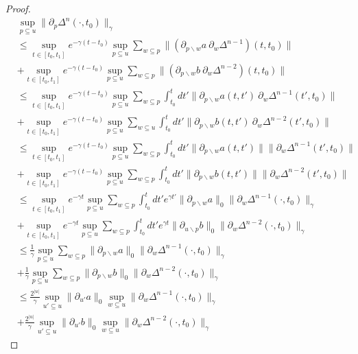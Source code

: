 \documentclass[b5paper,draft,openbib,12pt]{memoir}
\begin{document}
\begin{proof}
\begin{align}
  &\sup_{p\subseteq u}\|\partial_p \Delta^n (\cdot,t_0)\|_{\gamma}\\
  &\le 
  \sup_{t\in[t_0,t_1]} e^{-\gamma(t-t_0)}\sup_{p\subseteq u} 
  \sum_{w\subseteq p} 
  \| (\partial_{p\backslash w}a ~
  \partial_w \Delta^{n-1})(t,t_0)\|\\
  &+\sup_{t\in[t_0,t_1]} e^{-\gamma(t-t_0)}\sup_{p\subseteq u} 
  \sum_{w\subseteq p} 
  \|  (\partial_{p\backslash w}b ~
  \partial_w \Delta^{n-2})(t,t_0) \|\\
  &\le
  \sup_{t\in[t_0,t_1]} e^{-\gamma(t-t_0)}
  \sup_{p\subseteq u} \sum_{w\subseteq p} 
  \int_{t_0}^{t}dt' 
  \| \partial_{p\backslash w}a(t,t') ~
  \partial_w \Delta^{n-1}(t',t_0)\|\\
  &+ \sup_{t\in[t_0,t_1]} e^{-\gamma(t-t_0)}
  \sup_{p\subseteq u}\sum_{w\subseteq u} 
  \int_{t_0}^{t}dt'  
  \|  \partial_{p\backslash w}b(t,t') ~
  \partial_w \Delta^{n-2}(t',t_0) \|\\
  &\le
  \sup_{t\in[t_0,t_1]} e^{-\gamma(t-t_0)}
  \sup_{p\subseteq u} \sum_{w\subseteq p} 
  \int_{t_0}^{t}dt' 
  \| \partial_{p\backslash w}a(t,t')\|
  \|\partial_w \Delta^{n-1}(t',t_0)\|\\
  &+ \sup_{t\in[t_0,t_1]} e^{-\gamma(t-t_0)}
  \sup_{p\subseteq u} \sum_{w\subseteq p} 
  \int_{t_0}^{t}dt'  
  \|  \partial_{p\backslash w}b(t,t')\|
  \|\partial_w \Delta^{n-2}(t',t_0) \|\\
  &\le
  \sup_{t\in[t_0,t_1]} e^{-\gamma t}
  \sup_{p\subseteq u} \sum_{w\subseteq p} 
  \int_{t_0}^{t}dt' e^{\gamma t'}
  \| \partial_{p\backslash w}a \|_{0}
  \|\partial_w \Delta^{n-1}(\cdot,t_0)\|_{\gamma}\\
  &+ \sup_{t\in[t_0,t_1]} e^{-\gamma t}
  \sup_{p\subseteq u}\sum_{w\subseteq p} 
  \int_{t_0}^{t}dt'  e^{\gamma t}
  \|  \partial_{u\backslash p}b\|_{0}
\|\partial_w \Delta^{n-2}(\cdot,t_0) \|_{\gamma}\\
&\le
\frac{1}{\gamma}\sup_{p\subseteq u} \sum_{w\subseteq p} 
\| \partial_{p\backslash w}a \|_{0}
\|\partial_w \Delta^{n-1}(\cdot,t_0)\|_{\gamma}\\
&+ \frac{1}{\gamma}
\sup_{p\subseteq u} \sum_{w\subseteq p} 
\|  \partial_{p\backslash w}b\|_{0}
\|\partial_w \Delta^{n-2}(\cdot,t_0) \|_{\gamma}\\
&\le
\frac{2^{|u|}}{\gamma}
\sup_{u'\subseteq u}\| \partial_{u'}a \|_{0}
  \sup_{w\subseteq u} 
\|\partial_w \Delta^{n-1}(\cdot,t_0)\|_{\gamma}\\
&+ \frac{2^{|u|}}{\gamma}
\sup_{u'\subseteq u}\| \partial_{u'}b \|_{0}
\sup_{w\subseteq u}
\|\partial_w \Delta^{n-2}(\cdot,t_0) \|_{\gamma}
\end{align}


\end{proof}
\end{document}
